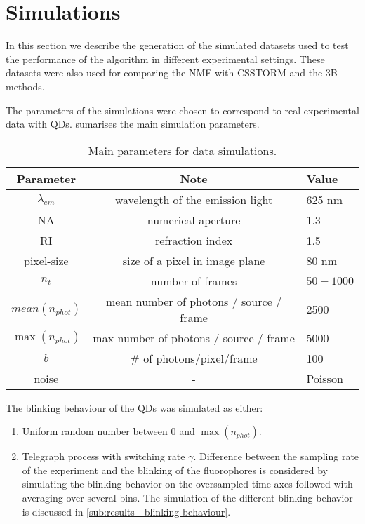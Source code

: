 
\clearpage
\section{Simulations \label{sec:simulations}}
In this section we describe the generation of the simulated datasets used to test the performance of the algorithm in different experimental settings. These datasets were also used for comparing the NMF with CSSTORM \cite{Zhu2012} and the 3B \cite{Cox2011} methods. 


The parameters of the simulations were chosen to correspond to real experimental data with QDs.   sumarises the main simulation parameters. 
%
\begin{table}[!h]
	\centering
	\begin{tabular}{|c|c|l|}
		\hline 
		Parameter 		& Note  							& Value\tabularnewline
		\hline \hline 
		$\lambda_{em}$ 	& wavelength of the emission light 	& 625 nm\tabularnewline
		\hline 
		NA 				& numerical aperture 				& 1.3\tabularnewline
		\hline 
		RI 				& refraction index 					& 1.5\tabularnewline
		\hline 
		pixel-size 		& size of a pixel in image plane	& 80 nm\tabularnewline
		\hline 
		$n_{t}$ 			& number of frames  					& $50-1000$\tabularnewline
		\hline 
		$\unit{mean}(n_{phot})$ & mean number of photons / source / frame 	& 2500\tabularnewline
		\hline 
		$\max(n_{phot})$ & max number of photons / source / frame 	& 5000\tabularnewline
		\hline 
		$b$ 				& \# of photons/pixel/frame 			& 100\tabularnewline
		\hline
		noise			& 		-						& Poisson\tabularnewline
		\hline
	\end{tabular}
	\caption{Main parameters for data simulations.}
	\label{tab:Simulations parameters}
\end{table}

The blinking behaviour of the QDs was simulated as either:
%
\begin{enumerate}
	\item
	Uniform random number between $0$ and $\max(n_{phot})$.
	\item
	Telegraph process with switching rate $\gamma$. Difference between the sampling rate of the experiment and the blinking of the fluorophores is considered by simulating the blinking behavior on the oversampled time axes followed with averaging over several bins. The simulation of the different blinking behavior is discussed in \autoref{sub:results - blinking behaviour}. 
\end{enumerate}
 
